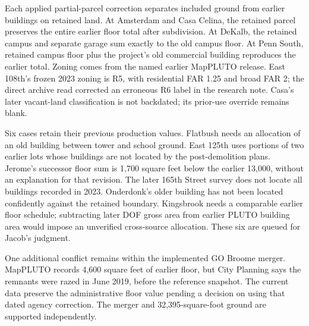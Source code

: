 Each applied partial-parcel correction separates included ground from earlier
buildings on retained land. At Amsterdam and Casa Celina, the retained parcel
preserves the entire earlier floor total after subdivision. At DeKalb, the
retained campus and separate garage sum exactly to the old campus floor.
At Penn South, retained campus floor plus the project's old commercial
building reproduces the earlier total. Zoning comes from the named earlier
MapPLUTO release. East 108th's frozen 2023 zoning is R5, with residential FAR
1.25 and broad FAR 2; the direct archive read corrected an erroneous R6 label
in the research note. Casa's later vacant-land classification is not backdated;
its prior-use override remains blank.

Six cases retain their previous production values. Flatbush needs an allocation
of an old building between tower and school ground. East 125th uses portions
of two earlier lots whose buildings are not located by the post-demolition
plans. Jerome's successor floor sum is 1,700 square feet below the earlier
13,000, without an explanation for that revision. The later 165th Street
survey does not locate all buildings recorded in 2023. Onderdonk's older
building has not been located confidently against the retained boundary.
Kingsbrook needs a comparable earlier floor schedule; subtracting later DOF
gross area from earlier PLUTO building area would impose an unverified
cross-source allocation. These six are queued for Jacob's judgment.

One additional conflict remains within the implemented GO Broome merger.
MapPLUTO records 4,600 square feet of earlier floor, but City Planning says
the remnants were razed in June 2019, before the reference snapshot. The
current data preserve the administrative floor value pending a decision on
using that dated agency correction. The merger and 32,395-square-foot ground
are supported independently.

